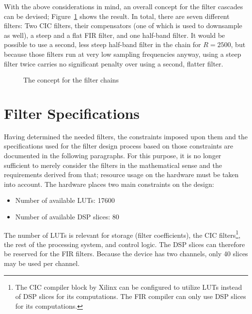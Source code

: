 With  the above  considerations in  mind, an  overall concept  for the  filter
cascades  can  be  devised; Figure~\ref{fig:fdesign:chain_concept}  shows  the
result. In total,  there are seven  different filters: Two CIC  filters, their
compensators (one of which is used to  downsample as well), a steep and a flat
FIR filter,  and one half-band filter. It  would be possible to  use a second,
less  steep half-band  filter in  the chain  for $R=2500$,  but because  those
filters run  at very  low sampling  frequencies anyway,  using a  steep filter
twice carries no significant penalty over using a second, flatter filter.

\begin{figure}
    \centering
    
    \caption[Filter Chain Concept]{The concept for the filter chains}
    \label{fig:fdesign:chain_concept}
\end{figure}

%
%
\section{Filter Specifications} %
\label{sec:fdesign:filter_specifications}

Having determined  the needed filters,  the constraints imposed upon  them and
the  specifications  used  for  the  filter  design  process  based  on  those
constraints are documented in the  following paragraphs.  For this purpose, it
is no  longer sufficient to  merely consider  the filters in  the mathematical
sense and the  requirements derived from that; resource usage  on the hardware
must be taken  into account.  The hardware places two  main constraints on the
design:
\begin{itemize}\tightlist
    \item
        Number of available LUTs: \num{17600}
    \item
        Number of available DSP slices: \num{80}
\end{itemize}
The number  of LUTs  is relevant  for storage  (filter coefficients),  the CIC
filters\footnote{%
    The CIC compiler block by Xilinx can be configured to utilize LUTs instead
    of DSP  slices for  its computations. The  FIR compiler  can only  use DSP
    slices for its computations.%
},
the  rest of  the processing  system, and  control logic. The  DSP slices  can
therefore  be  reserved  for  the  FIR filters. Because  the  device  has  two
channels, only 40 slices may be used per channel.

